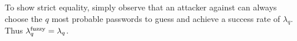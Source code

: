 





To show strict equality, simply observe that an attacker against \opchecker 
can always choose the $q$ most probable passwords to guess
and achieve a success rate of $\lambda_q$. Thus $\lambda^\textnormal{fuzzy}_q=\lambda_q$.
\qedsym\\

